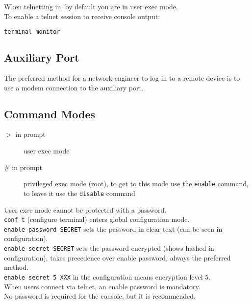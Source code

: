 When telnetting in, by default you are in user exec mode.\\

To enable a telnet session to receive console output:

\begin{verbatim}
terminal monitor
\end{verbatim}

\subsection{Auxiliary Port}

The preferred method for a network engineer to log in to a remote device is
to use a modem connection to the auxiliary port.

\subsection{Command Modes}

\begin{description}

\item[$>$ in prompt]
user exec mode

\item[\# in prompt]
privileged exec mode (root), to get to this mode use the \texttt{enable}
command, to leave it use the \texttt{disable} command

\end{description}

User exec mode cannot be protected with a password.\\

\texttt{conf t} (configure terminal) enters global configuration mode.\\

\texttt{enable password SECRET} sets the password in clear text (can be seen
in configuration).\\

\texttt{enable secret SECRET} sets the password encrypted (shows hashed in
configuration), takes precedence over enable password, always the preferred
method.\\

\texttt{enable secret 5 XXX} in the configuration means encryption level 5.\\

When users connect via telnet, an enable password is mandatory.\\

No password is required for the console, but it is recommended.\\

